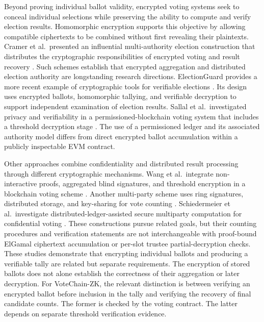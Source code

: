 \label{subsec:related-encrypted-tally}
Beyond proving individual ballot validity, encrypted voting systems seek to conceal individual selections while preserving the ability to compute and verify election results. Homomorphic encryption supports this objective by allowing compatible ciphertexts to be combined without first revealing their plaintexts. Cramer et al.\ presented an influential multi-authority election construction that distributes the cryptographic responsibilities of encrypted voting and result recovery \citep{cramer1997multiauthority}. Such schemes establish that encrypted aggregation and distributed election authority are longstanding research directions. ElectionGuard provides a more recent example of cryptographic tools for verifiable elections \citep{benaloh2024electionguard}. Its design uses encrypted ballots, homomorphic tallying, and verifiable decryption to support independent examination of election results. Sallal et al.\ investigated privacy and verifiability in a permissioned-blockchain voting system that includes a threshold decryption stage \citep{sallal2023pvpbc}. The use of a permissioned ledger and its associated authority model differs from direct encrypted ballot accumulation within a publicly inspectable EVM contract.

Other approaches combine confidentiality and distributed result processing through different cryptographic mechanisms. Wang et al.\ integrate non-interactive proofs, aggregated blind signatures, and threshold encryption in a blockchain voting scheme \citep{wang2024versatile}. Another multi-party scheme uses ring signatures, distributed storage, and key-sharing for vote counting \citep{wang2024multiparty}. Schiedermeier et al.\ investigate distributed-ledger-assisted secure multiparty computation for confidential voting \citep{schiedermeier2024mpc}. These constructions pursue related goals, but their counting procedures and verification statements are not interchangeable with proof-bound ElGamal ciphertext accumulation or per-slot trustee partial-decryption checks. These studies demonstrate that encrypting individual ballots and producing a verifiable tally are related but separate requirements. The encryption of stored ballots does not alone establish the correctness of their aggregation or later decryption. For VoteChain-ZK, the relevant distinction is between verifying an encrypted ballot before inclusion in the tally and verifying the recovery of final candidate counts. The former is checked by the voting contract. The latter depends on separate threshold verification evidence.

